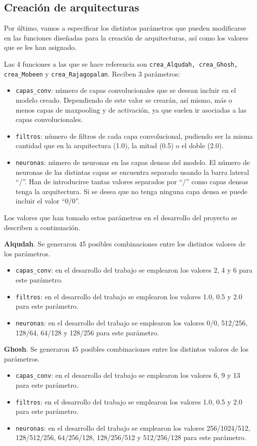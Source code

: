 \subsection{Creación de arquitecturas}

Por último, vamos a especificar los distintos parámetros que pueden modificarse en las funciones diseñadas para la creación de arquitecturas, así como los valores que se les han asignado.

Las 4 funciones a las que se hace referencia son \texttt{crea\_Alqudah, crea\_Ghosh, crea\_Mobeen} y \texttt{crea\_Rajagopalan}. Reciben 3 parámetros:
\begin{itemize}
    \item \texttt{capas\_conv}: número de capas convolucionales que se desean incluir en el modelo creado. Dependiendo de este valor se crearán, así mismo, más o menos capas de maxpooling y de activación, ya que suelen ir asociadas a las capas convolucionales.
    \item \texttt{filtros}: número de filtros de cada capa convolucional, pudiendo ser la misma cantidad que en la arquitectura (1.0), la mitad (0.5) o el doble (2.0).
    \item \texttt{neuronas}: número de neuronas en las capas densas del modelo. El número de neuronas de las distintas capas se encuentra separado usando la barra lateral “/”. Han de introducirse tantas valores separados por ``/'' como capas densas tenga la arquitectura. Si se desea que no tenga ninguna capa densa se puede incluir el valor ``0/0''.
\end{itemize}

Los valores que han tomado estos parámetros en el desarrollo del proyecto se describen a continuación.

\textbf{Alqudah}. Se generaron 45 posibles combinaciones entre los distintos valores de los parámetros.
\begin{itemize}
    \item \texttt{capas\_conv}: en el desarrollo del trabajo se emplearon los valores 2, 4 y 6 para este parámetro.
    \item \texttt{filtros}: en el desarrollo del trabajo se emplearon los valores 1.0, 0.5 y 2.0 para este parámetro.
    \item \texttt{neuronas}: en el desarrollo del trabajo se emplearon los valores 0/0, 512/256, 128/64, 64/128 y 128/256 para este parámetro.
\end{itemize}

\textbf{Ghosh}. Se generaron 45 posibles combinaciones entre los distintos valores de los parámetros.
\begin{itemize}
    \item \texttt{capas\_conv}: en el desarrollo del trabajo se emplearon los valores 6, 9 y 13 para este parámetro.
    \item \texttt{filtros}: en el desarrollo del trabajo se emplearon los valores 1.0, 0.5 y 2.0 para este parámetro.
    \item \texttt{neuronas}: en el desarrollo del trabajo se emplearon los valores 256/1024/512, 128/512/256, 64/256/128, 128/256/512 y 512/256/128 para este parámetro.
\end{itemize}

